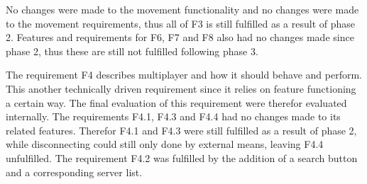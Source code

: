         No changes were made to the movement functionality and no changes were made to the movement requirements, thus all of F3 is still fulfilled as a result of phase 2. Features and requirements for F6, F7 and F8 also had no changes made since phase 2, thus these are still not fulfilled following phase 3.
        
        The requirement F4 describes multiplayer and how it should behave and perform. This another technically driven requirement since it relies on feature functioning a certain way. The final evaluation of this requirement were therefor evaluated internally. The requirements F4.1, F4.3 and F4.4 had no changes made to its related features. Therefor F4.1 and F4.3 were still fulfilled as a result of phase 2, while disconnecting could still only done by external means, leaving F4.4 unfulfilled. The requirement F4.2 was fulfilled by the addition of a search button and a corresponding server list. 
        